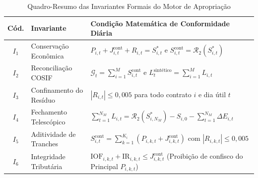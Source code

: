 \documentclass[11pt, a4paper]{article}
\begin{document}
\begin{table}[h!]
\centering
\caption{Quadro-Resumo das Invariantes Formais do Motor de Apropriação}
\vspace{0.2cm}
\footnotesize
\setlength{\tabcolsep}{4pt}
\begin{tabularx}{\textwidth}{@{}c p{3.8cm} X@{}}
\toprule
\textbf{Cód.} & \textbf{Invariante} & \textbf{Condição Matemática de Conformidade Diária} \\
\midrule
$I_1$ & Conservação Econômica & $P_{i,t} + J_{i,t}^{\text{cont}} + R_{i,t} = S_{i,t}^{*}$ e $S_{i,t}^{\text{cont}} = \mathcal{R}_2(S_{i,t}^{*})$ \\
\rowcolor{lightgray}
$I_2$ & Reconciliação COSIF & $\mathcal{G}_t = \sum_{i=1}^{M} S_{i,t}^{\text{cont}}$ e $L_t^{\text{sintético}} = \sum_{i=1}^{M} L_{i,t}$ \\
$I_3$ & Confinamento do Resíduo & $|R_{i,t}| \le 0{,}005$ para todo contrato $i$ e dia útil $t$ \\
\rowcolor{lightgray}
$I_4$ & Fechamento Telescópico & $\sum_{t=1}^{N_M} L_{i,t} = \mathcal{R}_2(S_{i,N_M}^{*}) - S_{i,0} - \sum_{t=1}^{N_M} \Delta E_{i,t}$ \\
$I_5$ & Aditividade de Tranches & $S_{i,t}^{\text{cont}} = \sum_{k=1}^{K_i} (P_{i,k,t} + J_{i,k,t}^{\text{cont}})$ com $|R_{i,k,t}| \le 0{,}005$ \\
\rowcolor{lightgray}
$I_6$ & Integridade Tributária & $\text{IOF}_{i,k,t} + \text{IR}_{i,k,t} \le J_{i,k,t}^{\text{cont}}$ (Proibição de confisco do Principal $P_{i,k,t}$) \\
\bottomrule
\end{tabularx}
\end{table}
\end{document}
